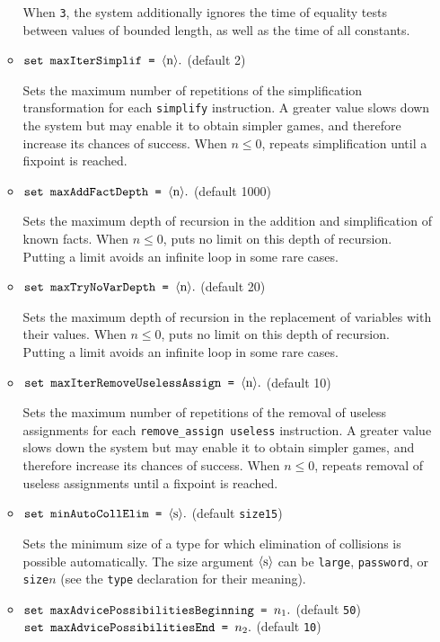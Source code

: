 \begin{itemize}
\begin{itemize}
When {\tt 3}, the system additionally ignores the time of equality
tests between values of bounded length, as well as the time of
all constants.

\item $\texttt{set maxIterSimplif = }\langle\textrm{n}\rangle{\tt .}$ (default 2)

Sets the maximum number of repetitions of the simplification transformation
for each {\tt simplify} instruction.
A greater value slows down the system but may enable it to obtain
simpler games, and therefore increase its chances of success.
When $n \leq 0$, repeats simplification until a fixpoint is reached.

\item $\texttt{set maxAddFactDepth = }\langle\textrm{n}\rangle{\tt .}$ (default 1000)

Sets the maximum depth of recursion in the addition and simplification
of known facts. 
When $n \leq 0$, puts no limit on this depth of recursion.
Putting a limit avoids an infinite loop in some rare cases.

\item $\texttt{set maxTryNoVarDepth = }\langle\textrm{n}\rangle{\tt .}$ (default 20)

Sets the maximum depth of recursion in the replacement of
variables with their values.
When $n \leq 0$, puts no limit on this depth of recursion.
Putting a limit avoids an infinite loop in some rare cases.

\item $\texttt{set maxIterRemoveUselessAssign = }\langle\textrm{n}\rangle{\tt .}$ (default 10)

Sets the maximum number of repetitions of the removal of useless assignments 
for each {\tt remove\string_assign useless} instruction.
A greater value slows down the system but may enable it to obtain
simpler games, and therefore increase its chances of success.
When $n \leq 0$, repeats removal of useless assignments until a fixpoint 
is reached.

\item $\texttt{set minAutoCollElim = }\langle\textrm{s}\rangle{\tt .}$ (default \texttt{size15})

Sets the minimum size of a type for which elimination of collisions is
possible automatically. The size argument $\langle\textrm{s}\rangle$ can be \texttt{large}, \texttt{password}, or \texttt{size}$n$ (see the \texttt{type} declaration for their meaning).

\item $\texttt{set maxAdvicePossibilitiesBeginning = }n_1{\tt .}$ (default \texttt{50})\\
$\texttt{set maxAdvicePossibilitiesEnd = }n_2{\tt .}$ (default \texttt{10})


\end{itemize}
\end{itemize}
